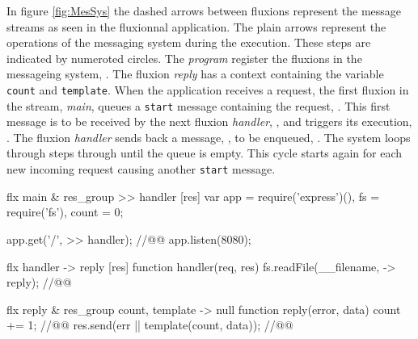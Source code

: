 In figure \ref{fig:MesSys} the dashed arrows between fluxions represent the message streams as seen in the fluxionnal application.
The plain arrows represent the operations of the messaging system during the execution.
These steps are indicated by numeroted circles.
The \textit{program} register the fluxions in the messageing system, .
The fluxion \textit{reply} has a context containing the variable \texttt{count} and \texttt{tem\-plate}.
When the application receives a request, the first fluxion in the stream, \textit{main}, queues a \texttt{start} message containing the request, .
This first message is to be received by the next fluxion \textit{handler}, , and triggers its execution, .
The fluxion \textit{handler} sends back a message, , to be enqueued, .
The system loops through steps  through  until the queue is empty.
This cycle starts again for each new incoming request causing another \texttt{start} message.




\begin{code}[flx, caption={Example application expressed in the high-level fluxional language}, label={lst:fluxional}]
flx main & res\_group
>> handler [res]
  var app = require('express')(),
      fs = require('fs'),
      count = 0;

  app.get('/', >> handler); //@\label{lst:fluxional-streamtohandler}@
  app.listen(8080);

flx handler
-> reply [res]
  function handler(req, res) {
    fs.readFile(__filename, -> reply); //@\label{lst:fluxional-readfile}@
  }

flx reply & res\_group {count, template}
-> null
  function reply(error, data) {
    count += 1; //@\label{lst:fluxional-counter}@
    res.send(err || template(count, data)); //@\label{lst:fluxional-ressend}@
  }
\end{code}

